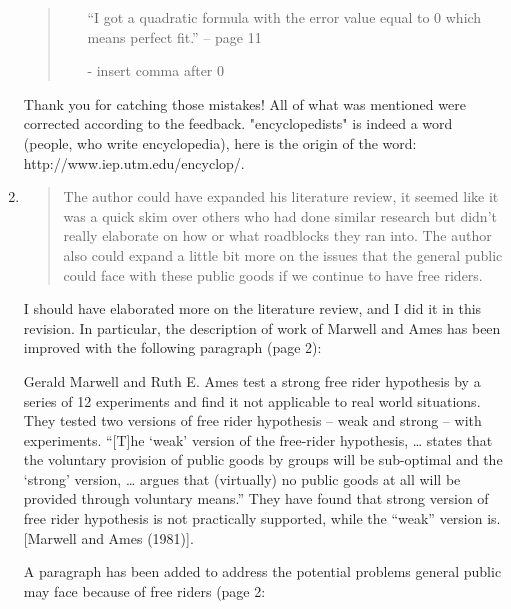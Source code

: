 \documentclass{article}
\newenvironment{itquote}
	{\begin{quote}\itshape}
	{\end{quote}\ignorespacesafterend}
\newenvironment{itpars}
	{\par\itshape}
	{\par}
\begin{document}
\begin{enumerate}
\begin{itquote}
\begin{itemize}
							“I got a quadratic formula with the error value equal to 0 which means perfect fit.” – page 11
							
							- insert comma after 0

					\end{itemize}


				\end{itquote}

				Thank you for catching those mistakes! All of what was mentioned were corrected according to the feedback. "encyclopedists" is indeed a word (people, who write encyclopedia), here is the origin of the word: http://www.iep.utm.edu/encyclop/.

			\item

				\begin{itquote}

					The author could have expanded his literature review, it seemed like it was a quick skim over others who had done similar research but didn't really elaborate on how or what roadblocks they ran into. The author also could expand a little bit more on the issues that the general public could face with these public goods if we continue to have free riders.

				\end{itquote}

				I should have elaborated more on the literature review, and I did it in this revision. In particular, the description of work of Marwell and Ames has been improved with the following paragraph (page 2):

				\begin{itpars}

					Gerald Marwell and Ruth E. Ames test a strong free rider hypothesis by a series of 12 experiments and find it not applicable to real world situations. They tested two versions of free rider hypothesis – weak and strong – with experiments. “[T]he ‘weak’ version of the free-rider hypothesis, … states that the voluntary provision of public goods by groups will be sub-optimal and the ‘strong’ version, … argues that (virtually) no public goods at all will be provided through voluntary means.” They have found that strong version of free rider hypothesis is not practically supported, while the “weak” version is. [Marwell and Ames (1981)].

				\end{itpars}

				A paragraph has been added to address the potential problems general public may face because of free riders (page 2:


\end{enumerate}
\end{document}
